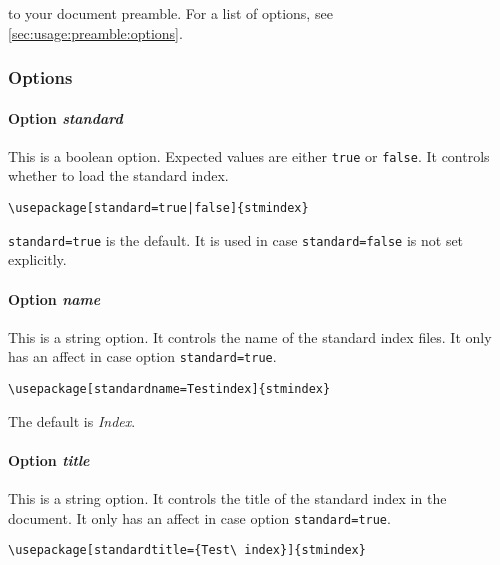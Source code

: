 \documentclass[%
  type=article,%
  layout=koma,%
  conditionallox=true,%
  conditionalloxnewpage=false,%
  date=true,%
  hyperref=true,%
  index=false,%
  listings=true%
]{stmtext}
\begin{document}
to your document preamble. For a list of options, see \autoref{sec:usage:preamble:options}.

\subsubsection{Options}
\label{sec:usage:preamble:options}

\paragraph{Option \protect\textit{standard}} 
\label{sec:usage:preamble:options:standard}

This is a boolean option. Expected values are either \texttt{true} or \texttt{false}. It controls whether to load the standard index.

\begin{verbatim}
\usepackage[standard=true|false]{stmindex}
\end{verbatim}

\texttt{standard=true} is the default. It is used in case \texttt{standard=false} is not set explicitly.

\paragraph{Option \protect\textit{name}} 
\label{sec:usage:preamble:options:name}

This is a string option. It controls the name of the standard index files. It only has an affect in case option \texttt{standard=true}.

\begin{verbatim}
\usepackage[standardname=Testindex]{stmindex}
\end{verbatim}

The default is \textit{Index}.

\paragraph{Option \protect\textit{title}} 
\label{sec:usage:preamble:options:title}

This is a string option. It controls the title of the standard index in the document. It only has an affect in case option \texttt{standard=true}.

\begin{verbatim}
\usepackage[standardtitle={Test\ index}]{stmindex}
\end{verbatim}
\end{document}
